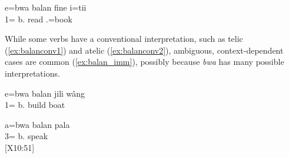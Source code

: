 \ea\label{ex:balanconv2}
\gll 	e=bwa balan fine i=tii	\\
	1= b. read .=book	\\
\glt	{}%
\z

While some verbs have a conventional interpretation, such as telic (\ref{ex:balanconv1}) and atelic (\ref{ex:balanconv2}), ambiguous, context-dependent cases are common (\ref{ex:balan_imm}), possibly because \textit{bwa} has many possible interpretations. %

\ea \label{ex:balan_imm}
\gll 	e=bwa balan jili wâng	\\
	1= b. build boat\\
\glt	{}%
\z

\ea 
\gll a=bwa balan pala\\
 3= b. speak\\
\glt {} {[X10:51]}
\z


%
%
%
%
%
%
%
%
%
%
%

